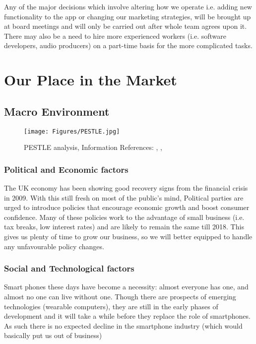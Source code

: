 \documentclass[12pt]{article}
\begin{document}
Any of the major decisions which involve altering how we operate i.e. adding new functionality to the app or changing our marketing strategies, will be brought up at board meetings and will only be carried out after whole team agrees upon it. There may also be a need to hire more experienced workers (i.e. software developers, audio producers) on a part-time basis for the more complicated tasks.

\section{Our Place in the Market}

\subsection{Macro Environment}

\begin{figure}
    \centering
    \texttt{[image: Figures/PESTLE.jpg]}
    \caption{PESTLE analysis, Information References: \cite{PWC2015}, \cite{eMarketer}, \cite{HM_Treasury2015}}
    \label{fig:pestle}
\end{figure}

\subsubsection*{Political and Economic factors}
The UK economy has been showing good recovery signs from the financial crisis in 2009. With this still fresh on most of the public's mind, Political parties are urged to introduce policies that encourage economic growth and boost consumer confidence. Many of these policies work to the advantage of small business (i.e. tax breaks, low interest rates) and are likely to remain the same till 2018. This gives us plenty of time to grow our business, so we will better equipped to handle any unfavourable policy changes.

\subsubsection*{Social and Technological factors}
Smart phones these days have become a necessity: almost everyone has one, and almost no one can live without one. Though there are prospects of emerging technologies (wearable computers), they are still in the early phases of development and it will take a while before they replace the role of smartphones. As such there is no expected decline in the smartphone industry (which would basically put us out of business)
\end{document}
